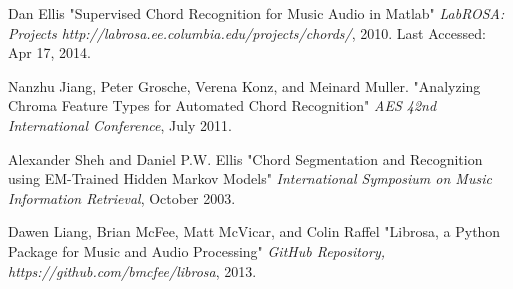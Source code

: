 \documentclass{article}
\begin{document}
\begin{thebibliography}{citations}
Dan Ellis
"Supervised Chord Recognition for Music Audio in Matlab"
{\it LabROSA: Projects http://labrosa.ee.columbia.edu/projects/chords/},
2010. Last Accessed: Apr 17, 2014. 

Nanzhu Jiang, Peter Grosche, Verena Konz, and Meinard Muller.
"Analyzing Chroma Feature Types for Automated Chord Recognition"
{\it AES 42nd International Conference},
July 2011.

Alexander Sheh and Daniel P.W. Ellis
"Chord Segmentation and Recognition using EM-Trained Hidden Markov Models"
{\it International Symposium on Music Information Retrieval},
October 2003.

Dawen Liang, Brian McFee, Matt McVicar, and Colin Raffel
"Librosa, a Python Package for Music and Audio Processing"
{\it GitHub Repository, https://github.com/bmcfee/librosa},
2013.

\end{thebibliography}


\end{document}
